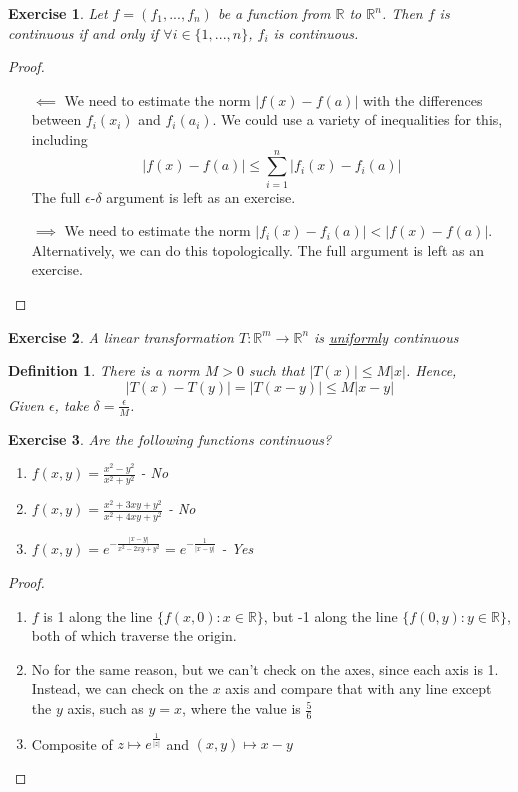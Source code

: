 \documentclass{article}
\newtheorem{definition}{Definition}
\newtheorem{exercise}{Exercise}
\newcommand{\reals}[0]{\mathbb{R}}
\begin{document}
\begin{exercise}
  Let \(f = (f_1,...,f_n)\) be a function from \(\reals\) to \(\reals^n\). Then \(f\) is continuous if and only if \(\forall i \in \{1,...,n\}\), \(f_i\) is continuous.
\end{exercise}
\begin{proof}
  \begin{itemize}

    \item [\(\impliedby\)] We need to estimate the norm \(|f(x) - f(a)|\) with the differences between \(f_i(x_i)\) and \(f_i(a_i)\). We could use a variety of inequalities for this, including
    \begin{equation}|f(x) - f(a)| \leq \sum_{i = 1}^n|f_i(x) - f_i(a)|\end{equation}
    The full \(\epsilon\)-\(\delta\) argument is left as an exercise.

    \item [\(\implies\)] We need to estimate the norm \(|f_i(x) - f_i(a)| < |f(x) - f(a)|\). Alternatively, we can do this topologically. The full argument is left as an exercise.

  \end{itemize}

\end{proof}
\begin{exercise}
  A linear transformation \(T: \reals^m \to\reals^n\) is \underline{uniformly} continuous
\end{exercise}
\begin{definition}
   There is a norm \(M > 0\) such that \(|T(x)| \leq M|x|\). Hence,
   \begin{equation}|T(x) - T(y)| = |T(x - y)| \leq M|x - y|\end{equation}
   Given \(\epsilon\), take \(\delta = \frac{\epsilon}{M}\).
\end{definition}
\begin{exercise}
  Are the following functions continuous?
  \begin{enumerate}
    \item \(f(x, y) = \frac{x^2 - y^2}{x^2 + y^2}\) - No
    \item \(f(x, y) = \frac{x^2 + 3xy + y^2}{x^2 + 4xy + y^2}\) - No
    \item \(f(x, y) = e^{-\frac{|x - y|}{x^2 - 2xy + y^2}} = e^{-\frac{1}{|x - y|}}\) - Yes
  \end{enumerate}
\end{exercise}
\begin{proof}
  \begin{enumerate}
    \item \(f\) is 1 along the line \(\{f(x, 0) : x \in \reals\}\), but -1 along the line \(\{f(0, y) : y \in \reals\}\), both of which traverse the origin.
    \item No for the same reason, but we can't check on the axes, since each axis is 1. Instead, we can check on the \(x\) axis and compare that with any line except the \(y\) axis, such as \(y = x\), where the value is \(\frac{5}{6}\)
    \item Composite of \(z \mapsto e^{\frac{1}{|z|}}\) and \((x, y) \mapsto x - y\)
  \end{enumerate}
\end{proof}
\end{document}
